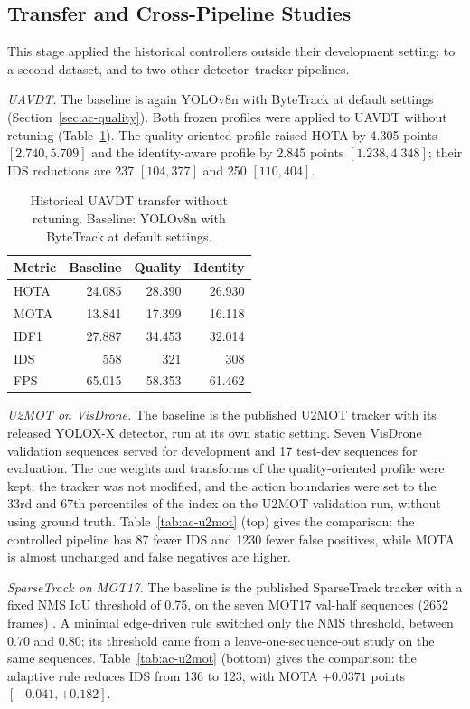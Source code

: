 \subsection{Transfer and Cross-Pipeline Studies}\label{sec:ac-transfer}
This stage applied the historical controllers outside their development setting: to a second dataset, and to two other detector--tracker pipelines.

\emph{UAVDT.} The baseline is again YOLOv8n with ByteTrack at default settings (Section~\ref{sec:ac-quality}). Both frozen profiles were applied to UAVDT \cite{du2018uavdt} without retuning (Table~\ref{tab:ac-histuavdt}). The quality-oriented profile raised HOTA by 4.305 points $[2.740, 5.709]$ and the identity-aware profile by 2.845 points $[1.238, 4.348]$; their IDS reductions are 237 $[104, 377]$ and 250 $[110, 404]$.

\begin{table}[tbp]
\centering
\caption{Historical UAVDT transfer without retuning. Baseline: YOLOv8n with ByteTrack at default settings.}
\label{tab:ac-histuavdt}
\begin{tabular}{lrrr}
\toprule
Metric & Baseline & Quality & Identity\\
\midrule
HOTA & 24.085 & 28.390 & 26.930\\
MOTA & 13.841 & 17.399 & 16.118\\
IDF1 & 27.887 & 34.453 & 32.014\\
IDS & 558 & 321 & 308\\
FPS & 65.015 & 58.353 & 61.462\\
\bottomrule
\end{tabular}
\end{table}

\emph{U2MOT on VisDrone.} The baseline is the published U2MOT tracker \cite{liu2023u2mot} with its released YOLOX-X detector, run at its own static setting. Seven VisDrone validation sequences served for development and 17 test-dev sequences for evaluation. The cue weights and transforms of the quality-oriented profile were kept, the tracker was not modified, and the action boundaries were set to the 33rd and 67th percentiles of the index on the U2MOT validation run, without using ground truth. Table~\ref{tab:ac-u2mot} (top) gives the comparison: the controlled pipeline has 87 fewer IDS and 1230 fewer false positives, while MOTA is almost unchanged and false negatives are higher.

\emph{SparseTrack on MOT17.} The baseline is the published SparseTrack tracker \cite{liu2025sparsetrack} with a fixed NMS IoU threshold of 0.75, on the seven MOT17 val-half sequences (2652 frames) \cite{dendorfer2021motchallenge}. A minimal edge-driven rule switched only the NMS threshold, between 0.70 and 0.80; its threshold came from a leave-one-sequence-out study on the same sequences. Table~\ref{tab:ac-u2mot} (bottom) gives the comparison: the adaptive rule reduces IDS from 136 to 123, with MOTA $+0.0371$ points $[-0.041, +0.182]$.

